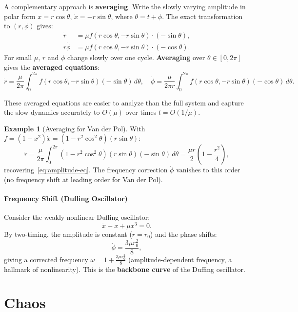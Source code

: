\documentclass[11pt,letterpaper]{article}
\theoremstyle{definition}
\newtheorem{example}{Example}[section]
\theoremstyle{plain}
\theoremstyle{remark}
\begin{document}
A complementary approach is \textbf{averaging}.  Write the slowly
varying amplitude in polar form $x = r\cos\theta$,
$\dot{x} = -r\sin\theta$, where $\theta = t + \phi$.  The exact
transformation to $(r,\phi)$ gives:
\begin{align}
  \dot{r} &= \mu f(r\cos\theta,-r\sin\theta)\cdot(-\sin\theta), \\
  r\dot{\phi} &= \mu f(r\cos\theta,-r\sin\theta)\cdot(-\cos\theta).
\end{align}
For small $\mu$, $r$ and $\phi$ change slowly over one cycle.
\textbf{Averaging} over $\theta\in[0,2\pi]$ gives the
\textbf{averaged equations}:
\begin{equation}
  \dot{r} = \frac{\mu}{2\pi}\int_0^{2\pi}
  f(r\cos\theta,-r\sin\theta)(-\sin\theta)\,d\theta, \quad
  \dot{\phi} = \frac{\mu}{2\pi r}\int_0^{2\pi}
  f(r\cos\theta,-r\sin\theta)(-\cos\theta)\,d\theta.
\end{equation}

These averaged equations are easier to analyze than the full system
and capture the slow dynamics accurately to $O(\mu)$ over times
$t = O(1/\mu)$.

\begin{example}[Averaging for Van der Pol]
With $f = (1-x^2)\dot{x} = (1-r^2\cos^2\theta)(r\sin\theta)$:
\[
  \dot{r} = \frac{\mu}{2\pi}\int_0^{2\pi}(1-r^2\cos^2\theta)(r\sin\theta)
  (-\sin\theta)\,d\theta
  = \frac{\mu r}{2}\!\left(1-\frac{r^2}{4}\right),
\]
recovering~\eqref{eq:amplitude-eq}. The frequency correction
$\dot{\phi}$ vanishes to this order (no frequency shift at leading
order for Van der Pol).
\end{example}

\subsection{Frequency Shift (Duffing Oscillator)}

Consider the weakly nonlinear Duffing oscillator:
\[
  \ddot{x} + x + \mu x^3 = 0.
\]
By two-timing, the amplitude is constant ($r = r_0$) and the phase
shifts:
\[
  \dot{\phi} = \frac{3\mu r_0^2}{8},
\]
giving a corrected frequency
$\omega = 1 + \frac{3\mu r_0^2}{8}$ (amplitude-dependent frequency,
a hallmark of nonlinearity).  This is the \textbf{backbone curve} of the
Duffing oscillator.

\part{Chaos}
\end{document}
